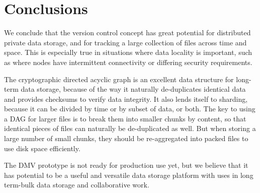 \section{Conclusions}

We conclude that the version control concept has great potential for distributed
private data storage, and for tracking a large collection of files across time
and space. This is especially true in situations where data locality is
important, such as where nodes have intermittent connectivity or differing
security requirements.

The cryptographic directed acyclic graph is an excellent data structure for
long-term data storage, because of the way it naturally de-duplicates identical
data and provides checksums to verify data integrity. It also lends itself to
sharding, because it can be divided by time or by subset of data, or both. The
key to using a DAG for larger files is to break them into smaller chunks by
content, so that identical pieces of files can naturally be de-duplicated as
well. But when storing a large number of small chunks, they should be
re-aggregated into packed files to use disk space efficiently.

The \gls{DMV} prototype is not ready for production use yet, but we believe that
it has potential to be a useful and versatile data storage platform with uses in
long term-bulk data storage and collaborative work.
